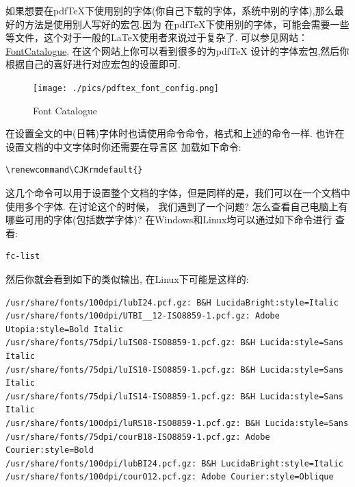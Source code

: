 \begin{remark}
如果想要在pdf\TeX{}下使用别的字体(你自己下载的字体，系统中别的字体),那么最好的方法是使用别人写好的宏包.因为
在pdf\TeX{}下使用别的字体，可能会需要一些等文件，这个对于一般的\LaTeX{}使用者来说过于复杂了.
可以参见网站：\href{https://tug.org/FontCatalogue/allfonts.html}{FontCatalogue}, 在这个网站上你可以看到很多的为pdf\TeX{}
设计的字体宏包,然后你根据自己的喜好进行对应宏包的设置即可.
\end{remark}

\begin{figure}[!htb]
    \centering
    \texttt{[image: ./pics/pdftex\_font\_config.png]}
    \caption{Font Catalogue}
    \label{fig:FontCatalogue}
\end{figure}


\begin{remark}
在设置全文的中(日韩)字体时也请使用命令\cmd{\setCJKmainfont}命令，格式和上述的命令一样. 也许在设置文档的中文字体时你还需要在导言区
加载如下命令:
\end{remark}
\begin{verbatim}
\renewcommand\CJKrmdefault{}
\end{verbatim}

这几个命令可以用于设置整个文档的字体，但是同样的是，我们可以在一个文档中使用多个字体. 在讨论这个的时候，
我们遇到了一个问题? 怎么查看自己电脑上有哪些可用的字体(包括数学字体)? 在Windows和Linux均可以通过如下命令进行
查看:
\begin{verbatim}
fc-list 
\end{verbatim}

然后你就会看到如下的类似输出, 在Linux下可能是这样的:
\begin{verbatim}
/usr/share/fonts/100dpi/lubI24.pcf.gz: B&H LucidaBright:style=Italic
/usr/share/fonts/100dpi/UTBI__12-ISO8859-1.pcf.gz: Adobe Utopia:style=Bold Italic
/usr/share/fonts/75dpi/luIS08-ISO8859-1.pcf.gz: B&H Lucida:style=Sans Italic
/usr/share/fonts/75dpi/luIS10-ISO8859-1.pcf.gz: B&H Lucida:style=Sans Italic
/usr/share/fonts/75dpi/luIS14-ISO8859-1.pcf.gz: B&H Lucida:style=Sans Italic
/usr/share/fonts/100dpi/luRS18-ISO8859-1.pcf.gz: B&H Lucida:style=Sans
/usr/share/fonts/75dpi/courB18-ISO8859-1.pcf.gz: Adobe Courier:style=Bold
/usr/share/fonts/100dpi/lubBI24.pcf.gz: B&H LucidaBright:style=Italic
/usr/share/fonts/100dpi/courO12.pcf.gz: Adobe Courier:style=Oblique
\end{verbatim}


